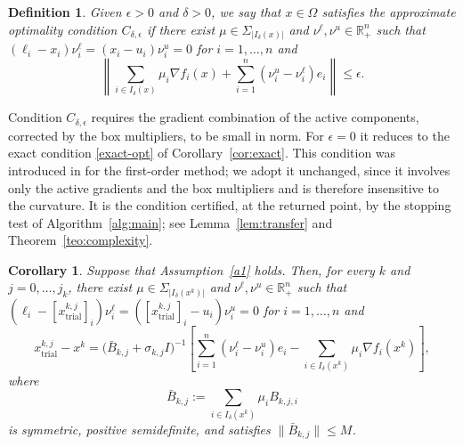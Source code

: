 \documentclass[11pt]{article}
\newcommand{\xkjtrial}{x^{k,j}_{\mathrm{trial}}}
\newtheorem{corollary}[theorem]{Corollary}
\newtheorem{definition}[theorem]{Definition}
\newcounter{alg}[section]
\begin{document}
\begin{definition} \label{def:optcond}
Given $\epsilon > 0$ and $\delta > 0$, we say that $x \in \Omega$ satisfies the
\textit{approximate optimality condition} $C_{\delta,\epsilon}$ if there exist
$\mu \in \Sigma_{|I_\delta(x)|}$ and $\nu^\ell, \nu^u \in \mathbb{R}^n_+$ such
that $(\ell_i - x_i)\nu^\ell_i = (x_i - u_i)\nu^u_i = 0$ for $i = 1, \ldots, n$
and
\begin{equation} \label{miaprox-box}
\left\| \sum_{i \in I_\delta(x)} \mu_i \nabla f_i(x)
+ \sum_{i=1}^{n} (\nu^u_i - \nu^\ell_i) e_i \right\| \leq \epsilon.
\end{equation}
\end{definition}

Condition $C_{\delta,\epsilon}$ requires the gradient combination of the active
components, corrected by the box multipliers, to be small in norm. For
$\epsilon = 0$ it reduces to the exact condition \eqref{exact-opt} of
Corollary~\ref{cor:exact}. This condition was introduced in \cite{alvarezovo}
for the first-order method; we adopt it unchanged, since it involves only the
active gradients and the box multipliers and is therefore insensitive to the
curvature. It is the condition certified, at the returned point, by the
stopping test of Algorithm~\ref{alg:main}; see Lemma~\ref{lem:transfer} and
Theorem~\ref{teo:complexity}.

\begin{corollary} \label{cor:step}
Suppose that Assumption~\ref{a1} holds. Then, for every $k$ and
$j = 0, \ldots, j_k$, there exist $\mu \in \Sigma_{|I_\delta(x^k)|}$ and
$\nu^\ell, \nu^u \in \mathbb{R}^n_+$ such that
$(\ell_i - [\xkjtrial]_i)\nu^\ell_i = ([\xkjtrial]_i - u_i)\nu^u_i = 0$ for
$i = 1, \ldots, n$ and
\begin{equation} \label{eqcoro1}
\xkjtrial - x^k = \big( \bar{B}_{k,j} + \sigma_{k,j} I \big)^{-1}
\left[ \sum_{i=1}^{n} (\nu^\ell_i - \nu^u_i) e_i
- \sum_{i \in I_\delta(x^k)} \mu_i \nabla f_i(x^k) \right],
\end{equation}
where
\begin{equation} \label{bbar}
\bar{B}_{k,j} := \sum_{i \in I_\delta(x^k)} \mu_i B_{k,j,i}
\end{equation}
is symmetric, positive semidefinite, and satisfies
$\|\bar{B}_{k,j}\| \leq M$.
\end{corollary}
\end{document}
